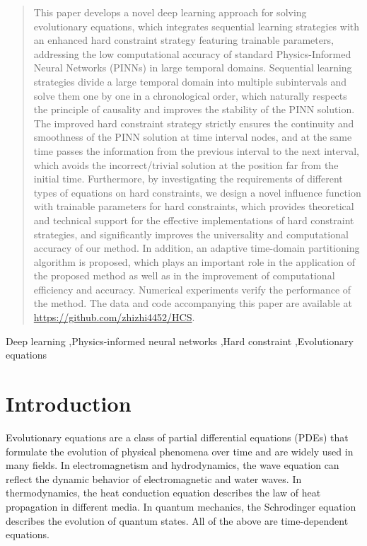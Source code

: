 \documentclass[preprint]{elsarticle}
\numberwithin{table}{section}
\numberwithin{equation}{section}
\numberwithin{figure}{section}
\begin{document}
\begin{CJK}{UTF8}{gbsn}
\begin{frontmatter}
\begin{abstract}
This paper develops a novel deep learning approach for solving evolutionary  equations, which integrates sequential learning   strategies  with an enhanced hard constraint strategy featuring trainable parameters, addressing the low computational accuracy of standard Physics-Informed Neural Networks (PINNs) in  large temporal domains. 
 Sequential learning strategies divide   a large  temporal domain  into multiple  {subintervals }  and  solve  them one by one in a chronological order, which naturally  respects the principle of causality  and improves the stability of the PINN solution. The improved hard constraint strategy  strictly ensures the continuity and smoothness of the PINN solution at time interval nodes, and at the same time passes the  {information} from the previous interval to the next interval, which avoids the incorrect/trivial solution at the position far from the initial time. Furthermore, by investigating  {the requirements of different types of equations} on hard constraints, we design a novel influence function with trainable parameters for hard constraints, which provides theoretical and technical support for the  {effective} implementation{s} of hard constraint strategies, and significantly improves the universality and computational accuracy of our method. In addition, an adaptive time-domain partitioning algorithm is
proposed, which plays an important role in the application of the proposed method as well as in the improvement of computational efficiency and accuracy. Numerical experiments verify the   performance of the method. 
 {The data and code accompanying this paper are available at \href{https://github.com/zhizhi4452/HCS}{https://github.com/zhizhi4452/HCS}.}
\end{abstract}

\begin{keyword}
Deep learning
\sep Physics-informed neural networks 
\sep Hard constraint
\sep Evolutionary equations
\end{keyword}
\end{frontmatter}

\section{Introduction}
Evolutionary equations are a class of partial differential equations (PDEs) that formulate the evolution of physical phenomena over time and are widely used in many fields. 
In electromagnetism and hydrodynamics, the wave equation can reflect the dynamic behavior of electromagnetic and water waves. 
In thermodynamics, the heat conduction equation describes the law of heat propagation in different media. 
In quantum mechanics, the
Schrodinger equation describes the evolution of quantum states. 
All of the above are time-dependent equations.


\end{CJK}
\end{document}
